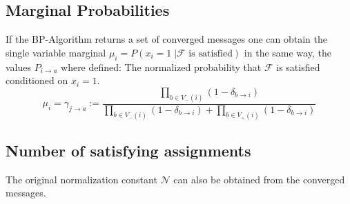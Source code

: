 \subsection{Marginal Probabilities}

If the BP-Algorithm returns a set of converged messages one can obtain the single variable marginal $\mu_i = P(x_i = 1 \; | \mathcal{F} \text{ is satisfied})$ in the same way, the values $P_{i \rightarrow a}$ where defined: The normalized probability that $\mathcal{F}$ is satisfied conditioned on $x_i = 1$.
$$ \mu_i = \gamma_{j \rightarrow a} := \frac{\prod_{b \in V_-(i)} (1 - \delta_{b \rightarrow i})}{\prod_{b \in V_-(i)} (1 - \delta_{b \rightarrow i}) + \prod_{b \in V_+(i)} (1 - \delta_{b \rightarrow i})}$$

\subsection{Number of satisfying assignments}

The original normalization constant $\mathcal{N}$ can also be obtained from the converged messages. 